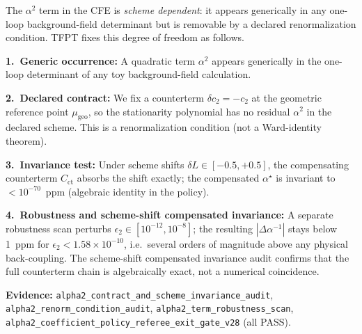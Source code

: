 \begin{tcolorbox}[colback=yellow!5, colframe=yellow!60!black,
    title={\textbf{Status of the $\alpha^2$ term: Renormalization Condition Contract}}, fonttitle=\bfseries\small]

The $\alpha^2$ term in the CFE is \emph{scheme dependent}: it appears generically in
any one-loop background-field determinant but is removable by a declared renormalization
condition.  TFPT fixes this degree of freedom as follows.

\textbf{1.\ Generic occurrence:}
A quadratic term $\alpha^2$ appears generically in the one-loop determinant
of any toy background-field calculation.

\textbf{2.\ Declared contract:}
We fix a counterterm $\delta c_2 = -c_2$ at the geometric reference point
$\mu_{\mathrm{geo}}$, so the stationarity polynomial has no residual $\alpha^2$
in the declared scheme.
This is a renormalization condition (not a Ward-identity theorem).

\textbf{3.\ Invariance test:}
Under scheme shifts $\delta L \in [-0.5,+0.5]$, the compensating counterterm
$C_{\mathrm{ct}}$ absorbs the shift exactly; the compensated $\alpha^\star$ is
invariant to $< 10^{-70}$~ppm (algebraic identity in the policy).

\textbf{4.\ Robustness and scheme-shift compensated invariance:}
A separate robustness scan perturbs $\epsilon_2\in[10^{-12},10^{-8}]$; the resulting
$|\Delta\alpha^{-1}|$ stays below 1~ppm for $\epsilon_2<1.58\times 10^{-10}$, i.e.\
several orders of magnitude above any physical back-coupling.
The scheme-shift compensated invariance audit confirms that the full counterterm
chain is algebraically exact, not a numerical coincidence.

\textbf{Evidence:} \texttt{alpha2\_contract\_and\_scheme\_invariance\_audit},
\texttt{alpha2\_renorm\_condition\_audit}, \texttt{alpha2\_term\_robustness\_scan},
\texttt{alpha2\_coefficient\_policy\_referee\_exit\_gate\_v28} (all PASS).
\end{tcolorbox}

